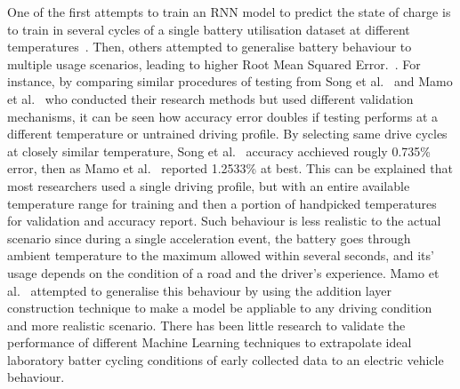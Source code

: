 %
%
One of the first attempts to train an RNN model to predict the state of charge is to train in several cycles of a single battery utilisation dataset at different temperatures~\cite{song_lithium-ion_2018, xiao_accurate_2019,javid_adaptive_2020, jiao_gru-rnn_2020}.
Then, others attempted to generalise battery behaviour to multiple usage scenarios, leading to higher Root Mean Squared Error.~\cite{mamo_long_2020}.
For instance, by comparing similar procedures of testing from Song et al.~\cite{song_lithium-ion_2018} and Mamo et al.~\cite{mamo_long_2020} who conducted their research methods but used different validation mechanisms, it can be seen how accuracy error doubles if testing performs at a different temperature or untrained driving profile.
By selecting same drive cycles at closely similar temperature, Song et al.~\cite{song_lithium-ion_2018} accuracy acchieved rougly 0.735\% error, then as Mamo et al.~\cite{mamo_long_2020} reported 1.2533\% at best.
This can be explained that most researchers used a single driving profile, but with an entire available temperature range for training and then a portion of handpicked temperatures for validation and accuracy report.
Such behaviour is less realistic to the actual scenario since during a single acceleration event, the battery goes through ambient temperature to the maximum allowed within several seconds, and its' usage depends on the condition of a road and the driver's experience.
Mamo et al.~\cite{mamo_long_2020} attempted to generalise this behaviour by using the addition layer construction technique to make a model be appliable to any driving condition and more realistic scenario.
There has been little research to validate the performance of different Machine Learning techniques to extrapolate ideal laboratory batter cycling conditions of early collected data to an electric vehicle behaviour.

